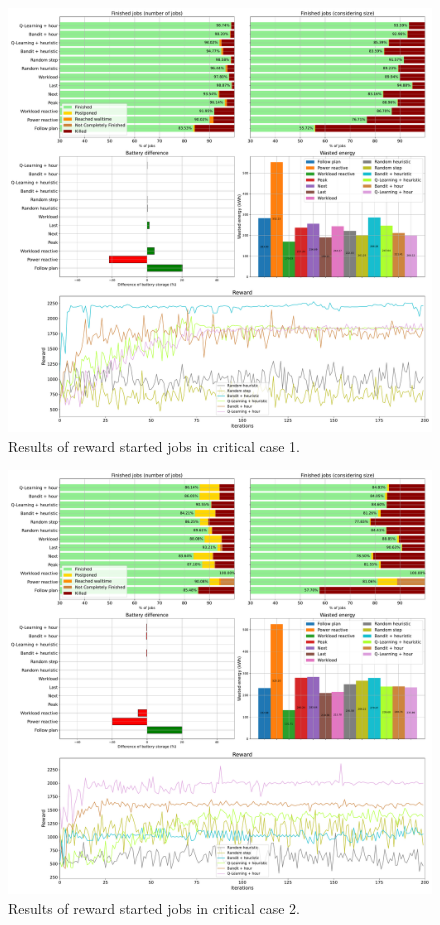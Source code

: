 \begin{figure}[!htb]
    \centering
    \includegraphics[scale=0.29]{Images/Learning_compensations/reward_started_profile_best_workload_1_with_noise_state_delta.pdf}
    \caption{Results of reward started jobs in critical case 1.}
    \label{fig:started_reward_results_critical_1}
\end{figure}

\begin{figure}[!htb]
    \centering
    \includegraphics[scale=0.29]{Images/Learning_compensations/reward_started_profile_best_workload_2_with_noise_state_delta.pdf}
    \caption{Results of reward started jobs in critical case 2.}
    \label{fig:started_reward_results_critical_2}
\end{figure}

